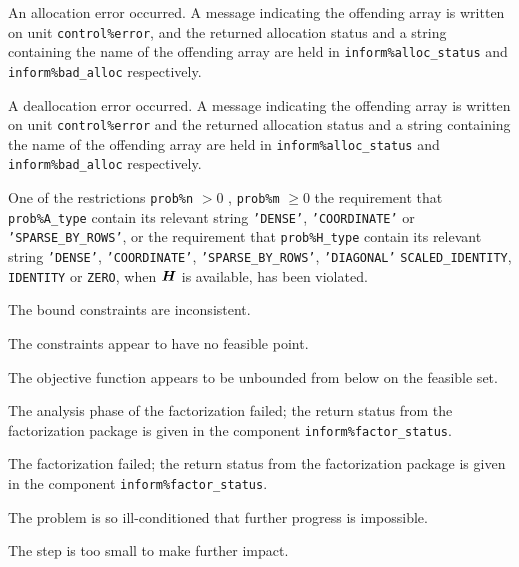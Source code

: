 \documentclass{galahad}
\begin{document}
\begin{description}

 An allocation error occurred. A message indicating
the offending
array is written on unit {\tt control\%error}, and the returned allocation
status and a string containing the name of the offending array
are held in {\tt inform\%alloc\_\-status}
and {\tt inform\%bad\_alloc} respectively.

 A deallocation error occurred.
A message indicating the offending
array is written on unit {\tt control\%error} and the returned allocation
status and a string containing the name of the offending array
are held in {\tt inform\%alloc\_\-status}
and {\tt inform\%bad\_alloc} respectively.

 One of the restrictions
 {\tt prob\%n} $> 0$ ,  {\tt prob\%m} $\geq 0$
    the requirement that {\tt prob\%A\_type} contain its relevant string
    {\tt 'DENSE'}, {\tt 'COORDINATE'} or {\tt 'SPARSE\_BY\_ROWS'},
    or the requirement that
    {\tt prob\%H\_type} contain its relevant string
    {\tt 'DENSE'}, {\tt 'COORDINATE'}, {\tt 'SPARSE\_BY\_ROWS'},
    {\tt 'DIAGONAL'}  {\tt SCALED\_IDENTITY}, {\tt IDENTITY} or {\tt ZERO},
    when ${\bm{H}}$ is available, has been violated.


 The bound constraints are inconsistent.

 The constraints appear to have no feasible point.

 The objective function appears to be unbounded
  from below on the feasible set.

 The analysis phase of the factorization failed;
  the return status from the factorization
    package is given in the component {\tt inform\%fac\-t\-or\_status}.

 The factorization failed; the return status
  from the factorization
    package is given in the component {\tt inform\%fac\-t\-or\_status}.

 The problem is so ill-conditioned that
 further progress is impossible.

 The step is too small to make further impact.


\end{description}
\end{document}
